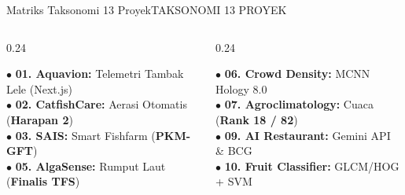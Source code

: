 \documentclass[aspectratio=169,11pt]{beamer}
\begin{document}
\begin{frame}{Matriks Taksonomi 13 Proyek}{TAKSONOMI 13 PROYEK}
  \begin{columns}[t]
    \begin{column}{0.24\textwidth}
      \begin{tcolorbox}[colback=brandCardBg,colframe=brandBorder,arc=2mm,boxrule=0.6pt,boxsep=2pt,top=3pt,bottom=3pt,title={\scriptsize \bfseries \color{brandNavy} A. Akuakultur IoT}]
        {\tiny \color{brandDark}
        $\bullet$ \textbf{01. Aquavion:} Telemetri Tambak Lele (Next.js) \\ \vspace{2pt}
        $\bullet$ \textbf{02. CatfishCare:} Aerasi Otomatis (\textbf{Harapan 2}) \\ \vspace{2pt}
        $\bullet$ \textbf{03. SAIS:} Smart Fishfarm (\textbf{PKM-GFT}) \\ \vspace{2pt}
        $\bullet$ \textbf{05. AlgaSense:} Rumput Laut (\textbf{Finalis TFS})
        }
      \end{tcolorbox}
    \end{column}

    \begin{column}{0.24\textwidth}
      \begin{tcolorbox}[colback=brandCardBg,colframe=brandBorder,arc=2mm,boxrule=0.6pt,boxsep=2pt,top=3pt,bottom=3pt,title={\scriptsize \bfseries \color{brandNavy} B. AI \& Machine Learning}]
        {\tiny \color{brandDark}
        $\bullet$ \textbf{06. Crowd Density:} MCNN Hology 8.0 \\ \vspace{2pt}
        $\bullet$ \textbf{07. Agroclimatology:} Cuaca (\textbf{Rank 18 / 82}) \\ \vspace{2pt}
        $\bullet$ \textbf{09. AI Restaurant:} Gemini API \& BCG \\ \vspace{2pt}
        $\bullet$ \textbf{10. Fruit Classifier:} GLCM/HOG + SVM
        }
      \end{tcolorbox}
    \end{column}


\end{columns}
\end{frame}
\end{document}
